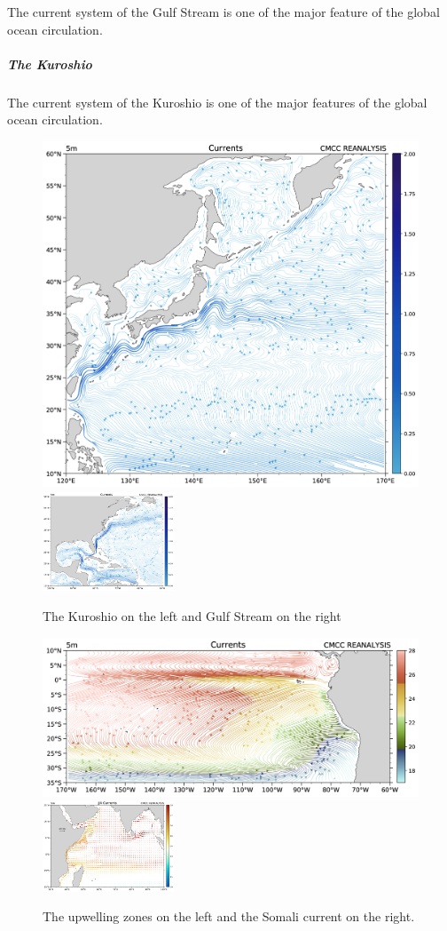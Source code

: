 The current system of the Gulf Stream is one of the major feature of the
global ocean circulation.


\subparagraph{The Kuroshio}\label{the-kuroshio}

The current system of the Kuroshio is one of the major features of the
global ocean circulation.


\begin{figure}[htpb!]
\centering
\includegraphics[width = 0.30 \textwidth]{uploads/44.png}\quad \includegraphics[width = 0.35\textwidth]{uploads/43.png}
\caption{The Kuroshio on the left and Gulf Stream on the right} \label{fig:}
\end{figure}

\begin{figure}[htpb!]
\centering
\includegraphics[width = 0.45 \textwidth]{uploads/45.png}\quad \includegraphics[width = 0.35\textwidth]{uploads/46.png}
\caption{The upwelling zones on the left and the Somali current on the right.} \label{fig:upwelzone}
\end{figure}




